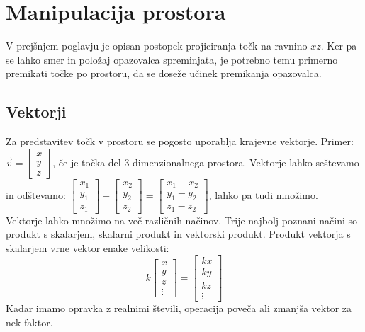 \documentclass[a4paper, 12px]{article}
\begin{document}
\section{Manipulacija prostora}
    V prejšnjem poglavju je opisan postopek projiciranja točk na ravnino $xz$.
    Ker pa se lahko smer in položaj opazovalca spreminjata, je potrebno temu primerno premikati
    točke po prostoru, da se doseže učinek premikanja opazovalca.
\subsection{Vektorji}
    Za predstavitev točk v prostoru se pogosto uporablja krajevne vektorje. Primer:
    $\vec{v}=\begin{bmatrix}
        x \\ y \\ z
    \end{bmatrix}$, če je točka del 3 dimenzionalnega prostora. Vektorje lahko seštevamo in odštevamo:
    $\begin{bmatrix}
        x_1 \\ y_1 \\ z_1
    \end{bmatrix} - \begin{bmatrix}
        x_2 \\ y_2 \\ z_2
    \end{bmatrix} = \begin{bmatrix}
        x_1 - x_2 \\ y_1 - y_2 \\ z_1 - z_2
    \end{bmatrix}$, lahko pa tudi množimo. \\

    Vektorje lahko množimo na več različnih načinov. Trije najbolj poznani načini so produkt s skalarjem, 
    skalarni produkt in vektorski produkt. Produkt vektorja s skalarjem vrne vektor enake velikosti:
    $$k \begin{bmatrix}
        x \\ y \\ z \\ \vdots
    \end{bmatrix} = \begin{bmatrix}
        k x \\ k y \\ k z \\ \vdots
    \end{bmatrix}$$
    Kadar imamo opravka z realnimi števili, operacija poveča ali zmanjša vektor za nek faktor. \\
\end{document}
